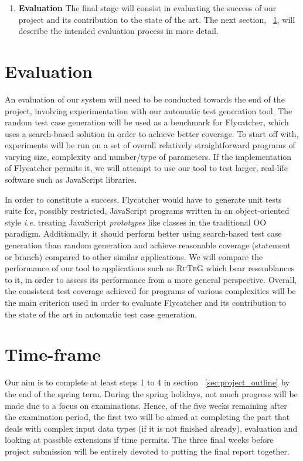 \documentclass[a4paper,11pt,titlepage]{report}
\begin{document}
\begin{enumerate}
	\item{\textbf{Evaluation}}
	The final stage will consist in evaluating the success of our project and its contribution to the state of the art. The next section, ~\ref{sec:evaluation}, will describe the intended evaluation process in more detail.

\end{enumerate}

\section{Evaluation}
\label{sec:evaluation}
An evaluation of our system will need to be conducted towards the end of the project, involving experimentation with our automatic test generation tool. The random test case generation will be used as a benchmark for \textsf{Flycatcher}, which uses a search-based solution in order to achieve better coverage. To start off with, experiments will be run on a set of overall relatively straightforward programs of varying size, complexity and number/type of parameters. If the implementation of \textsf{Flycatcher} permits it, we will attempt to use our tool to test larger, real-life software such as JavaScript libraries.

In order to constitute a success, \textsf{Flycatcher} would have to generate unit tests suite for, possibly restricted, JavaScript programs written in an object-oriented style \emph{i.e.} treating JavaScript \emph{prototypes} like classes in the traditional OO paradigm. Additionally, it should perform better using search-based test case generation than random generation and achieve reasonable coverage (statement or branch) compared to other similar applications. We will compare the performance of our tool to applications such as \textsc{RuTeG} which bear resemblances to it, in order to assess its performance from a more general perspective. Overall, the consistent test coverage achieved for programs of various complexities will be the main criterion used in order to evaluate \textsf{Flycatcher} and its contribution to the state of the art in automatic test case generation.

\section{Time-frame}
Our aim is to complete at least steps 1 to 4 in section ~\ref{sec:project_outline} by the end of the spring term. During the spring holidays, not much progress will be made due to a focus on examinations. Hence, of the five weeks remaining after the examination period, the first two will be aimed at completing the part that deals with complex input data types (if it is not finished already), evaluation and looking at possible extensions if time permits. The three final weeks before project submission will be entirely devoted to putting the final report together.



\end{document}
